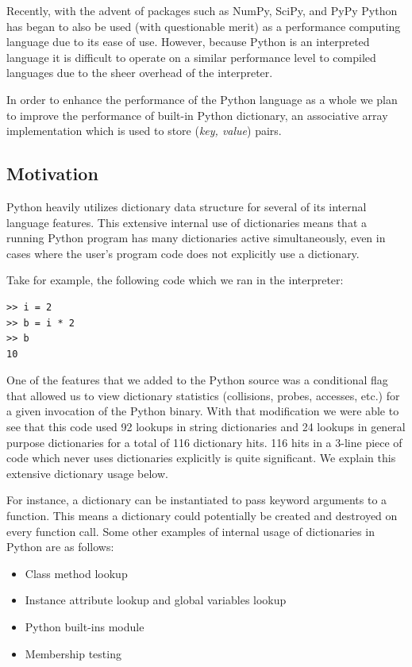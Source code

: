 \documentclass[runningheads,a4paper]{llncs}
\begin{document}
Recently, with the advent of packages such as NumPy, SciPy, and PyPy Python has began to also be used (with questionable merit) as a performance computing language due to its ease of use. However, because Python is an interpreted language it is difficult to operate on a similar performance level to compiled languages due to the sheer overhead of the interpreter.

In order to enhance the performance of the Python language as a whole we plan to improve the performance of built-in Python dictionary, an associative array implementation which is used to store (\textit{key, value}) pairs.

\subsection{Motivation}
Python heavily utilizes dictionary data structure for several of its internal language features. This extensive internal use of dictionaries means that a running Python program has many dictionaries active simultaneously, even in cases where the user's program code does not explicitly use a dictionary. 

Take for example, the following code which we ran in the interpreter:

\begin{verbatim}
>> i = 2 
>> b = i * 2
>> b
10
\end{verbatim}

One of the features that we added to the Python source was a conditional flag
that allowed us to view dictionary statistics (collisions, probes, accesses,
etc.) for a given invocation of the Python binary.  With that modification we
were able to see that this code used 92 lookups in string dictionaries and 24
lookups in general purpose dictionaries for a total of 116 dictionary hits. 116
hits in a 3-line piece of code which never uses dictionaries explicitly is quite
significant.  We explain this extensive dictionary usage below.

For instance, a dictionary can be instantiated to pass keyword arguments to a
function. This means a dictionary could potentially be created and destroyed on
every function call.  Some other examples of internal usage of dictionaries in
Python are as follows:

\begin{itemize}
\item Class method lookup
\item Instance attribute lookup and global variables lookup
\item Python built-ins module
\item Membership testing
\end{itemize}
\end{document}
